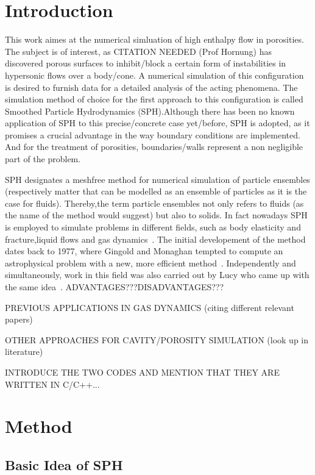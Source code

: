\documentclass{report}
\begin{document}


\tableofcontents
\chapter{Introduction}
\label{sec:intro}


This work aimes at the numerical simluation of high enthalpy flow in
porosities. The subject is of interest, as CITATION
NEEDED (Prof Hornung) has discovered porous surfaces to inhibit/block a
certain form of instabilities in hypersonic flows over a body/cone. A numerical
simulation of this configuration is desired to furnish data for a detailed
analysis of the acting phenomena. The simulation method of choice for the first approach
to this configuration is called Smoothed Particle Hydrodynamics (SPH).Although
there has been no known application of SPH to this precise/concrete case yet/before,
SPH is adopted, as it promises a crucial advantage in the way boundary
conditions are implemented. And for the treatment of porosities,
boundaries/walls represent a non negligible part of the problem.

SPH designates a meshfree method for numerical simulation of particle
ensembles (respectively matter that can be modelled as an ensemble of
particles as it is the case for fluids).
Thereby,the term particle ensembles not only refers
to fluids (as the name of the method would suggest) but also to solids. In
fact nowadays SPH is employed to simulate problems in different fields,
such as body elasticity and fracture,liquid flows and gas
dynamics~\cite{Monaghan2005}.
The initial developement of the method dates back to 1977, where Gingold and
Monaghan tempted to compute an astrophysical problem with a new, more
efficient method~\cite{Gingold1977}. Independently and simultaneously, work in
this field was also carried out by Lucy who came up with the same
idea~\cite{Lucy1977}.
ADVANTAGES???DISADVANTAGES???

PREVIOUS APPLICATIONS IN GAS DYNAMICS (citing different relevant papers)

OTHER APPROACHES FOR CAVITY/POROSITY SIMULATION (look up in literature)

INTRODUCE THE TWO CODES AND MENTION THAT THEY ARE WRITTEN IN C/C++...



\chapter{Method}
\label{sec:method}
\section{Basic Idea of SPH}
\label{sec:BasicsSPH}
\end{document}
